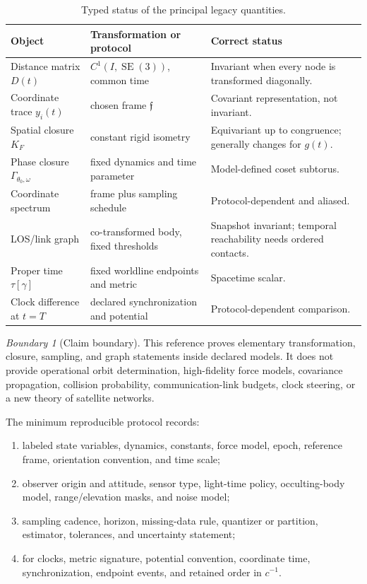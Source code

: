 \documentclass[11pt,a4paper]{article}
\theoremstyle{definition}
\theoremstyle{plain}
\theoremstyle{remark}
\newtheorem{warning}[definition]{Boundary}
\newcommand{\SE}{\operatorname{SE}}
\begin{document}
\begin{table}[ht]
\centering
\small
\caption{Typed status of the principal legacy quantities.}
\begin{tabularx}{\linewidth}{L{30mm}L{34mm}Y}
\toprule
Object & Transformation or protocol & Correct status\\
\midrule
Distance matrix \(D(t)\) &
\(C^1(I,\SE(3))\), common time &
Invariant when every node is transformed diagonally.\\
Coordinate trace \(y_i(t)\) &
chosen frame \(\mathfrak f\) &
Covariant representation, not invariant.\\
Spatial closure \(K_F\) &
constant rigid isometry &
Equivariant up to congruence; generally changes for \(g(t)\).\\
Phase closure \(\Gamma_{\theta_0,\omega}\) &
fixed dynamics and time parameter &
Model-defined coset subtorus.\\
Coordinate spectrum &
frame plus sampling schedule &
Protocol-dependent and aliased.\\
LOS/link graph &
co-transformed body, fixed thresholds &
Snapshot invariant; temporal reachability needs ordered contacts.\\
Proper time \(\tau[\gamma]\) &
fixed worldline endpoints and metric &
Spacetime scalar.\\
Clock difference at \(t=T\) &
declared synchronization and potential &
Protocol-dependent comparison.\\
\bottomrule
\end{tabularx}
\end{table}

\begin{warning}[Claim boundary]
This reference proves elementary transformation, closure, sampling,
and graph statements inside declared models.  It does not provide
operational orbit determination, high-fidelity force models,
covariance propagation, collision probability, communication-link
budgets, clock steering, or a new theory of satellite networks.
\end{warning}

The minimum reproducible protocol records:
\begin{enumerate}[label=(\roman*),leftmargin=1.7em]
  \item labeled state variables, dynamics, constants, force model,
  epoch, reference frame, orientation convention, and time scale;
  \item observer origin and attitude, sensor type, light-time policy,
  occulting-body model, range/elevation masks, and noise model;
  \item sampling cadence, horizon, missing-data rule, quantizer or
  partition, estimator, tolerances, and uncertainty statement;
  \item for clocks, metric signature, potential convention,
  coordinate time, synchronization, endpoint events, and retained
  order in \(c^{-1}\).
\end{enumerate}
\end{document}

